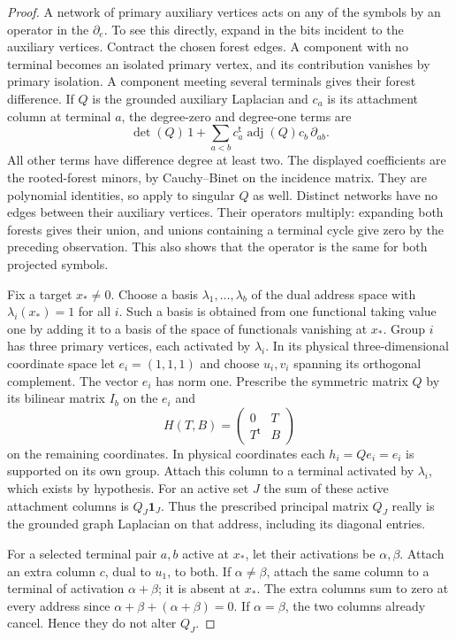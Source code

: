\documentclass[11pt]{article}
\theoremstyle{definition}
\theoremstyle{remark}
\begin{document}
\begin{proof}
A network of primary auxiliary vertices acts on any of the symbols
by an operator in the $\partial_e$.  To see this directly, expand in
the bits incident to the auxiliary vertices.  Contract the chosen
forest edges.  A component with no terminal becomes an isolated
primary vertex, and its contribution vanishes by primary isolation.
A component meeting several terminals gives their forest difference.
If $Q$ is the grounded auxiliary Laplacian and $c_a$ is its attachment
column at terminal $a$, the degree-zero and degree-one terms are
\[
 \det(Q)\,1+
 \sum_{a<b}c_a^{\mathsf t}\operatorname{adj}(Q)c_b\,
                    \partial_{ab}.
\]
All other terms have difference degree at least two.  The displayed
coefficients are the rooted-forest minors, by Cauchy--Binet on the
incidence matrix.  They are polynomial identities, so apply to
singular $Q$ as well.  Distinct networks have no edges between their
auxiliary vertices.  Their operators multiply: expanding both
forests gives their union, and unions containing a terminal cycle
give zero by the preceding observation.  This also shows that the
operator is the same for both projected symbols.

Fix a target $x_*\ne0$.  Choose a basis
$\lambda_1,\ldots,\lambda_b$ of the dual address space with
$\lambda_i(x_*)=1$ for all $i$.  Such a basis is obtained from one
functional taking value one by adding it to a basis of the space
of functionals vanishing at $x_*$.  Group $i$ has three primary vertices, each activated
by $\lambda_i$.  In its physical three-dimensional coordinate space
let $e_i=(1,1,1)$ and choose $u_i,v_i$ spanning its orthogonal
complement.  The vector $e_i$ has norm one.  Prescribe the symmetric
matrix $Q$ by its bilinear matrix $I_b$ on the $e_i$ and
\[
 H(T,B)=\begin{pmatrix}0&T\\T^{\mathsf t}&B\end{pmatrix}
\]
on the remaining coordinates.  In physical coordinates each
$h_i=Qe_i=e_i$ is supported on its own group.  Attach this column to
a terminal activated by $\lambda_i$, which exists by hypothesis.
For an active set $J$ the sum of these active attachment columns is
$Q_J\mathbf1_J$.  Thus the prescribed principal matrix $Q_J$ really
is the grounded graph Laplacian on that address, including its
diagonal entries.

For a selected terminal pair $a,b$ active at $x_*$, let their
activations be $\alpha,\beta$.  Attach an extra column $c$, dual to
$u_1$, to both.  If $\alpha\ne\beta$, attach the same column to a
terminal of activation $\alpha+\beta$; it is absent at $x_*$.  The
extra columns sum to zero at every address since
$\alpha+\beta+(\alpha+\beta)=0$.  If $\alpha=\beta$, the two
columns already cancel.  Hence they do not alter $Q_J$.


\end{proof}
\end{document}
